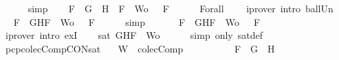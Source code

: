\begin{isabellebody}
\ \ \ \ \isamarkupfalse%
\ simp\isanewline
\ \ \isamarkupfalse%
\ {\isachardoublequoteopen}{\isasymforall}F\ {\isasymin}\ {\isacharparenleft}{\isacharbraceleft}G{\isacharbraceright}\ {\isasymunion}\ {\isacharbraceleft}H{\isacharbraceright}{\isacharparenright}\ {\isasymunion}\ {\isacharparenleft}{\isacharbraceleft}F{\isacharbraceright}\ {\isasymunion}\ Wo{\isacharparenright}{\isachardot}\ {\isasymA}\ {\isasymTurnstile}\ F{\isachardoublequoteclose}\isanewline
\ \ \ \ \isamarkupfalse%
\ Forall{}\ {}\ {}\ \isamarkupfalse%
\ {\isacharparenleft}iprover\ intro{\isacharcolon}\ ball{\isacharunderscore}Un{\isacharparenright}\isanewline
\ \ \isamarkupfalse%
\ \isamarkupfalse%
\ {\isachardoublequoteopen}{\isasymforall}F\ {\isasymin}\ {\isacharparenleft}{\isacharbraceleft}G{\isacharcomma}H{\isacharcomma}F{\isacharbraceright}\ {\isasymunion}\ Wo{\isacharparenright}{\isachardot}\ {\isasymA}\ {\isasymTurnstile}\ F{\isachardoublequoteclose}\isanewline
\ \ \ \ \isamarkupfalse%
\ simp\isanewline
\ \ \isamarkupfalse%
\ \isamarkupfalse%
\ {\isachardoublequoteopen}{\isasymexists}{\isasymA}{\isachardot}\ {\isasymforall}F\ {\isasymin}\ {\isacharparenleft}{\isacharbraceleft}G{\isacharcomma}H{\isacharcomma}F{\isacharbraceright}\ {\isasymunion}\ Wo{\isacharparenright}{\isachardot}\ {\isasymA}\ {\isasymTurnstile}\ F{\isachardoublequoteclose}\isanewline
\ \ \ \ \isamarkupfalse%
\ {\isacharparenleft}iprover\ intro{\isacharcolon}\ exI{\isacharparenright}\isanewline
\ \ \isamarkupfalse%
\ {\isachardoublequoteopen}sat\ {\isacharparenleft}{\isacharbraceleft}G{\isacharcomma}H{\isacharcomma}F{\isacharbraceright}\ {\isasymunion}\ Wo{\isacharparenright}{\isachardoublequoteclose}\isanewline
\ \ \ \ \isamarkupfalse%
\ {\isacharparenleft}simp\ only{\isacharcolon}\ sat{\isacharunderscore}def{\isacharparenright}\isanewline
{}\isamarkupfalse%
%
\endisatagproof
{\isafoldproof}%
%
\isadelimproof
\isanewline
%
\endisadelimproof
\isanewline
{}\isamarkupfalse%
\ pcp{\isacharunderscore}colecComp{\isacharunderscore}CON{\isacharunderscore}sat{}{\isacharcolon}\isanewline
\ \ \ {\isachardoublequoteopen}W\ {\isasymin}\ colecComp{\isachardoublequoteclose}\isanewline
\ \ \ \ \ \ \ \ \ \ {\isachardoublequoteopen}F\ {\isacharequal}\ \isactrlbold {\isasymnot}{\isacharparenleft}G\ \isactrlbold {\isasymor}\ H{\isacharparenright}{\isachardoublequoteclose}\isanewline

\end{isabellebody}
